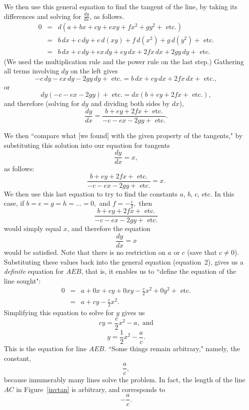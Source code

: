 \documentclass[twoside,openright]{article}
\begin{document}
 We then use this general equation to find the tangent of the line, by
 taking its differences and solving for
$\frac{dy}{dx}$, as follows.
\begin{eqnarray*}
0 & = & d(a + bx + cy + exy + fx^2 + gy^2 + \mbox{ etc.}) \\
& = & b\,dx + c\,dy + e\,d(xy) + f\,d(x^2) + g\,d(y^2) +\mbox{ etc.}\\
& = & b\,dx + c\,dy + ex\,dy + ey\,dx + 2fx\,dx + 2gy\,dy + \mbox{ etc.}
\end{eqnarray*}
(We used the multiplication rule and the power rule on the last step.)
Gathering all terms involving $dy$ on the left gives
$$ - c\,dy -ex\,dy - 2gy\,dy + \mbox{ etc.} = b\,dx + ey\,dx + 2fx\,dx +\mbox{ etc.},$$
or
$$dy( - c -ex - 2gy) + \mbox{ etc.} = dx(b + ey + 2fx +\mbox{ etc.}),$$
and therefore (solving for $dy$ and dividing both sides by $dx$),
$$\frac{dy}{dx} = \frac{b + ey + 2fx +\mbox{ etc.}}{- c - ex - 2gy +\mbox{ etc.}}.$$

We then ``compare what [we found] with the given property of the
tangents," by substituting this solution into our equation for
tangents
$$\frac{dy}{dx} = x,$$
as follows:
$$ \frac{b + ey + 2fx +\mbox{ etc.}}{- c - ex - 2gy +\mbox{ etc.}} = x.$$
We then use this last equation to try to find the constants $a$,
$b$, $c$, etc.
In this case, if
$b = e = g = h = \ldots = 0,$ and  $f = -\frac{c}{2},$ then 
$$\frac{b + ey + 2fx +\mbox{ etc.}}{- c - ex - 2gy +\mbox{ etc.}}$$
would simply equal $x$, and therefore the equation 
$$\frac{dy}{dx} =x$$ 
would be satisfied.
Note that there is no restriction on $a$ or $c$ (save that $c\neq 0$).  Substituting these
values back into the general equation (equation~2), gives us a {\em
  definite} equation for $AEB$, that is, it enables us to ``define the
equation of the line sought":
\begin{eqnarray*}
  0 & = & a + 0x + cy + 0xy - \frac{c}{2}x^2 + 0y^2 + \mbox{ etc.}\\
    & = & a + cy - \frac{c}{2}x^2.
\end{eqnarray*}
Simplifying this equation to solve for $y$ gives us
$$cy  =  \frac{c}{2}x^2 - a,\mbox{ and}$$
\begin{equation}
y  =  \frac{1}{2}x^2 - \frac{a}{c}.
\end{equation}
This is the equation for line $AEB$.  ``Some things remain arbitrary," namely, the constant, 
$$\frac{a}{c},$$
because innumerably many lines solve the problem.  In fact, the length
of the line $AC$ in Figure~\ref{invtan} is arbitrary, and corresponds
to
$$-\frac{a}{c}.$$
\setcounter{equation}{0}
\end{document}
